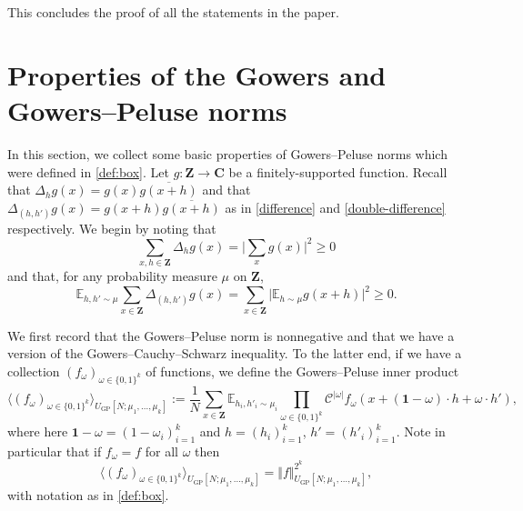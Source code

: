 \documentclass[11pt,reqno]{amsart}
\numberwithin{equation}{section}
\theoremstyle{definition}
\theoremstyle{remark}
\newcommand{\mb}{\mathbb}
\newcommand{\mc}{\mathcal}
\renewcommand{\ge}{\geqslant}
\newcommand\Z{\mathbf{Z}}
\newcommand\C{\mathbf{C}}
\newcommand\E{\mb{E}}
\newcommand\GP{\operatorname{GP}}
\begin{document}
This concludes the proof of all the statements in the paper. 

\appendix
\section{Properties of the Gowers and Gowers--Peluse norms}\label{appendixA}


In this section, we collect some basic properties of Gowers--Peluse norms which were defined in \cref{def:box}. Let $g : \Z \rightarrow \C$ be a finitely-supported function. Recall that $\Delta_h g(x) = g(x) \overline{g(x+h)}$ and that $\Delta_{(h,h')} g(x) = g(x + h) \overline{g(x+h)}$ as in \cref{difference} and \cref{double-difference} respectively. We begin by noting that
\begin{equation}\label{gowers-pos}
\sum_{x,h \in \Z} \Delta_h g(x) = \Big| \sum_x g(x) \Big|^2 \ge 0
\end{equation}
and that, for any probability measure $\mu$ on $\Z$, 
\begin{equation}\label{gowers-peluse-pos}
  \E_{h,h' \sim \mu}  \sum_{x \in \Z} \Delta_{(h,h')}g(x) = \sum_{x\in \Z} \Big| \E_{h \sim \mu} g(x + h) \Big|^2 \ge 0.
\end{equation}


We first record that the Gowers--Peluse norm is nonnegative and that we have a version of the Gowers--Cauchy--Schwarz inequality. To the latter end, if we have a collection $(f_{\omega})_{\omega \in \{0,1\}^k}$ of functions, we define the Gowers--Peluse inner product
\begin{equation}\label{gpip} \langle (f_{\omega})_{\omega \in \{0,1\}^k}\rangle_{U_{\GP}[N;\mu_1,\dots, \mu_k]} := \frac{1}{N} \sum_{x \in \Z} \E_{h_i, h'_i \sim \mu_i} \prod_{\omega \in \{0,1\}^k} \mc{C}^{|\omega|} f_{\omega} (x + (\mathbf{1} - \omega)\cdot h + \omega \cdot h'),\end{equation} where here $\mathbf{1} - \omega = (1 - \omega_i)_{i = 1}^k$ and $h = (h_i)_{i = 1}^k$, $h' = (h'_i)_{i = 1}^k$. Note in particular that if $f_{\omega} = f$ for all $\omega$ then
\[ \langle (f_{\omega})_{\omega \in \{0,1\}^k}\rangle_{U_{\GP}[N;\mu_1,\dots, \mu_k]} = \Vert f \Vert_{U_{\GP}[N;\mu_1,\dots, \mu_k]}^{2^k},\] with notation as in \cref{def:box}. 
\end{document}
